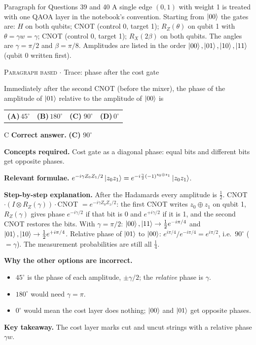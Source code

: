 \documentclass[11pt,a4paper]{article}
\newcommand{\optlabel}[1]{\textbf{(#1)}}
\newcommand{\correctlabel}[1]{\textcolor{okgreen}{\textbf{(#1)}\,\ding{51}}}
\newenvironment{qitem}[1]{\begin{list}{}{\setlength{\leftmargin}{3.3em}\setlength{\labelwidth}{3.1em}%
  \setlength{\labelsep}{0.2em}\setlength{\topsep}{3pt}\setlength{\parsep}{3pt}}\item[\textbf{Q.#1}\hfill]}{\end{list}}
\newcommand{\qsep}{\par\vspace{2pt}{\color{black!15}\hrule}\vspace{4pt}}
\newcommand{\qmeta}[2]{{\footnotesize\color{black!60}\textsc{#1} \;$\cdot$\; #2}\par}
\begin{document}
\begin{passagebox}{Paragraph for Questions 39 and 40}
A single edge $(0,1)$ with weight 1 is treated with one QAOA layer in the notebook's convention. Starting from
$\ket{00}$ the gates are: $H$ on both qubits; CNOT (control 0, target 1); $R_Z(\theta)$ on qubit 1 with $\theta = \gamma w = \gamma$;
CNOT (control 0, target 1); $R_X(2\beta)$ on both qubits. The angles are $\gamma = \pi/2$ and $\beta = \pi/8$.
Amplitudes are listed in the order $\ket{00}, \ket{01}, \ket{10}, \ket{11}$ (qubit 0 written first).
\end{passagebox}
\begin{qitem}{39}
\qmeta{Paragraph based}{Trace: phase after the cost gate}
Immediately after the second CNOT (before the mixer), the phase of the amplitude of $\ket{01}$ relative to the amplitude
of $\ket{00}$ is
\par\smallskip\noindent\begin{tabularx}{\linewidth}{@{}*{4}{L}@{}}
\optlabel{A}\,$45^\circ$ & \optlabel{B}\,$180^\circ$ & \correctlabel{C}\,$90^\circ$ & \optlabel{D}\,$0^\circ$
\end{tabularx}
\end{qitem}
\begin{solbox}{C}
\textbf{\color{brand}Correct answer.} \textcolor{okgreen}{\textbf{(C)}} $90^\circ$

\textbf{\color{brand}Concepts required.} Cost gate as a diagonal phase: equal bits and different bits get opposite phases.

\textbf{\color{brand}Relevant formulae.} $e^{-i\gamma Z_0Z_1/2}\ket{z_0z_1} = e^{-i\frac\gamma2(-1)^{z_0\oplus z_1}}\ket{z_0z_1}$.

\textbf{\color{brand}Step-by-step explanation.} After the Hadamards every amplitude is $\tfrac12$. CNOT$\cdot(I\otimes R_Z(\gamma))\cdot$CNOT $= e^{-i\gamma Z_0Z_1/2}$: the first CNOT
writes $z_0\oplus z_1$ on qubit 1, $R_Z(\gamma)$ gives phase $e^{-i\gamma/2}$ if that bit is 0 and $e^{+i\gamma/2}$ if it is 1, and the
second CNOT restores the bits. With $\gamma = \pi/2$:
$\ket{00}, \ket{11} \to \tfrac12 e^{-i\pi/4}$ and $\ket{01}, \ket{10} \to \tfrac12 e^{+i\pi/4}$.
Relative phase of $\ket{01}$ to $\ket{00}$: $e^{i\pi/4}/e^{-i\pi/4} = e^{i\pi/2}$, i.e.\ $90^\circ$ ($= \gamma$). The measurement
probabilities are still all $\tfrac14$.

\textbf{\color{brand}Why the other options are incorrect.}
\begin{itemize}[leftmargin=2.4em, itemsep=1pt, topsep=2pt]
\item[\textbf{(A)}] $45^\circ$ is the phase of each amplitude, $\pm\gamma/2$; the \emph{relative} phase is $\gamma$.
\item[\textbf{(B)}] $180^\circ$ would need $\gamma = \pi$.
\item[\textbf{(D)}] $0^\circ$ would mean the cost layer does nothing; $\ket{00}$ and $\ket{01}$ get opposite phases.
\end{itemize}
\textbf{\color{brand}Key takeaway.} The cost layer marks cut and uncut strings with a relative phase $\gamma w$.
\end{solbox}
\qsep
\end{document}
